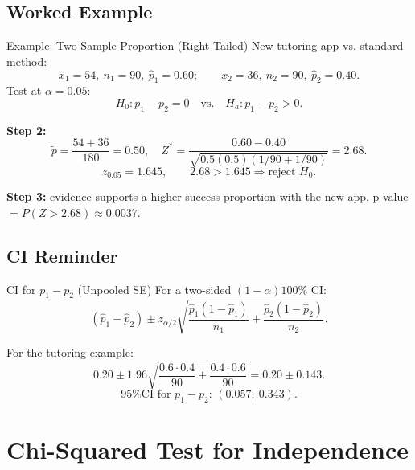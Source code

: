\documentclass[aspectratio=169]{beamer}
\begin{document}
\subsection{Worked Example}
\begin{frame}{Example: Two-Sample Proportion (Right-Tailed)}
  New tutoring app vs. standard method:
  \[
    x_1=54,\ n_1=90,\ \hat p_1=0.60;
    \qquad
    x_2=36,\ n_2=90,\ \hat p_2=0.40.
  \]
  Test at \(\alpha=0.05\):
  \[
    H_0:p_1-p_2=0
    \quad\text{vs.}\quad
    H_a:p_1-p_2>0.
  \]

  \textbf{Step 2:}
  \[
    \tilde p=\frac{54+36}{180}=0.50,
    \quad
    Z^*=\frac{0.60-0.40}{\sqrt{0.5(0.5)(1/90+1/90)}}=2.68.
  \]
  \[
    z_{0.05}=1.645,
    \qquad
    2.68>1.645\Rightarrow\text{reject }H_0.
  \]

  \textbf{Step 3:} evidence supports a higher success proportion with the new app.\newline
  p-value \(=P(Z>2.68)\approx 0.0037\).
\end{frame}

\subsection{CI Reminder}
\begin{frame}{CI for \(p_1-p_2\) (Unpooled SE)}
  For a two-sided \((1-\alpha)100\%\) CI:
  \[
    (\hat p_1-\hat p_2)\pm z_{\alpha/2}
    \sqrt{\frac{\hat p_1(1-\hat p_1)}{n_1}+\frac{\hat p_2(1-\hat p_2)}{n_2}}.
  \]

  For the tutoring example:
  \[
    0.20\pm 1.96\sqrt{\frac{0.6\cdot0.4}{90}+\frac{0.4\cdot0.6}{90}}
    =0.20\pm 0.143.
  \]
  \[
    \text{95\% CI for }p_1-p_2\text{: }(0.057,\ 0.343).
  \]
\end{frame}

\section{Chi-Squared Test for Independence}
\end{document}
